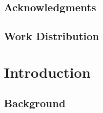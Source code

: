 \documentclass[letterpage, 11pt]{report}
\begin{document}
\newpage



\section*{Acknowledgments}\label{section:acknowledgments}
\pagestyle{plain}

\lipsum[1]

\vspace{2in}
\section*{Work Distribution}
\lipsum[2]
\newpage

\tableofcontents



\mbox{}



\chapter{Introduction}\label{chapter:introduction}
\setcounter{page}{1}
\onehalfspacing

\section{Background}

\printbibliography
\end{document}
